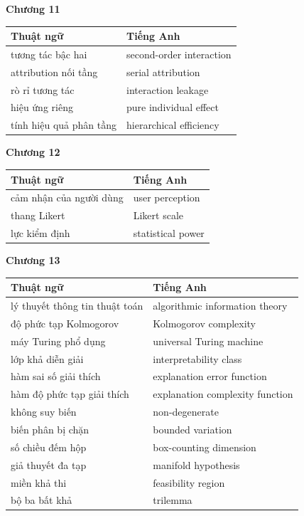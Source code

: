 \medskip

\textbf{Chương 11}

\begin{tabular}{@{}lp{7cm}@{}}
\toprule
Thuật ngữ & Tiếng Anh \\
\midrule
tương tác bậc hai & second-order interaction \\
attribution nối tầng & serial attribution \\
rò rỉ tương tác & interaction leakage \\
hiệu ứng riêng & pure individual effect \\
tính hiệu quả phân tầng & hierarchical efficiency \\
\bottomrule
\end{tabular}

\medskip

\textbf{Chương 12}

\begin{tabular}{@{}lp{7cm}@{}}
\toprule
Thuật ngữ & Tiếng Anh \\
\midrule
cảm nhận của người dùng & user perception \\
thang Likert & Likert scale \\
lực kiểm định & statistical power \\
\bottomrule
\end{tabular}

\medskip

\textbf{Chương 13}

\begin{tabular}{@{}lp{7cm}@{}}
\toprule
Thuật ngữ & Tiếng Anh \\
\midrule
lý thuyết thông tin thuật toán & algorithmic information theory \\
độ phức tạp Kolmogorov & Kolmogorov complexity \\
máy Turing phổ dụng & universal Turing machine \\
lớp khả diễn giải & interpretability class \\
hàm sai số giải thích & explanation error function \\
hàm độ phức tạp giải thích & explanation complexity function \\
không suy biến & non-degenerate \\
biến phân bị chặn & bounded variation \\
số chiều đếm hộp & box-counting dimension \\
giả thuyết đa tạp & manifold hypothesis \\
miền khả thi & feasibility region \\
bộ ba bất khả & trilemma \\
\bottomrule
\end{tabular}

